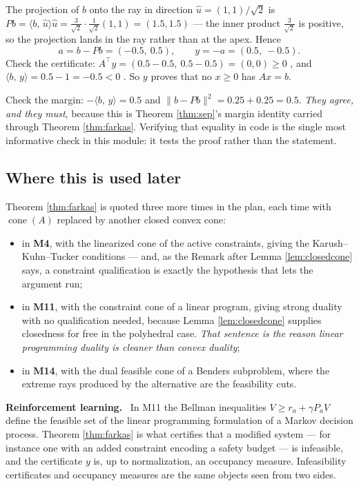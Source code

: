 \documentclass[11pt,a4paper]{article}
\newcommand{\mpart}[1]{\smallskip\noindent\textbf{#1}\ \ignorespaces}
\theoremstyle{definition}
\theoremstyle{plain}
\theoremstyle{remark}
\newcommand{\ip}[2]{\langle #1,\, #2\rangle}
\newcommand{\norm}[1]{\lVert #1\rVert}
\newcommand{\proj}{P}
\DeclareMathOperator{\cone}{cone}
\begin{document}
The projection of $b$ onto the ray in direction $\hat u=(1,1)/\sqrt2$ is
$\proj b=\ip{b}{\hat u}\hat u=\tfrac{3}{\sqrt2}\cdot\tfrac{1}{\sqrt2}(1,1)=(1.5,1.5)$ --- the
inner product $\tfrac3{\sqrt2}$ is positive, so the projection lands in the ray rather than at
the apex. Hence
\[
a=b-\proj b=(-0.5,\ 0.5),\qquad y=-a=(0.5,\ -0.5) .
\]
Check the certificate: $A^\top y=(0.5-0.5,\ 0.5-0.5)=(0,0)\ge0$ \checkmark, and
$\ip{b}{y}=0.5-1=-0.5<0$ \checkmark. So $y$ proves that no $x\ge0$ has $Ax=b$.

Check the margin: $-\ip{b}{y}=0.5$ and $\norm{b-\proj b}^2=0.25+0.25=0.5$. \emph{They agree,
and they must}, because this is Theorem \ref{thm:sep}'s margin identity carried through Theorem
\ref{thm:farkas}. Verifying that equality in code is the single most informative check in this
module: it tests the proof rather than the statement.

\subsection*{Where this is used later}

Theorem \ref{thm:farkas} is quoted three more times in the plan, each time with $\cone(A)$
replaced by another closed convex cone:
\begin{itemize}
\item in \textbf{M4}, with the linearized cone of the active constraints, giving the
Karush--Kuhn--Tucker conditions --- and, as the Remark after Lemma \ref{lem:closedcone} says, a
constraint qualification is exactly the hypothesis that lets the argument run;
\item in \textbf{M11}, with the constraint cone of a linear program, giving strong duality with
no qualification needed, because Lemma \ref{lem:closedcone} supplies closedness for free in the
polyhedral case. \emph{That sentence is the reason linear programming duality is cleaner than
convex duality};
\item in \textbf{M14}, with the dual feasible cone of a Benders subproblem, where the extreme
rays produced by the alternative are the feasibility cuts.
\end{itemize}

\mpart{Reinforcement learning.} In M11 the Bellman inequalities $V\ge r_a+\gamma P_aV$ define
the feasible set of the linear programming formulation of a Markov decision process. Theorem
\ref{thm:farkas} is what certifies that a modified system --- for instance one with an added
constraint encoding a safety budget --- is infeasible, and the certificate $y$ is, up to
normalization, an occupancy measure. Infeasibility certificates and occupancy measures are the
same objects seen from two sides.
\end{document}
